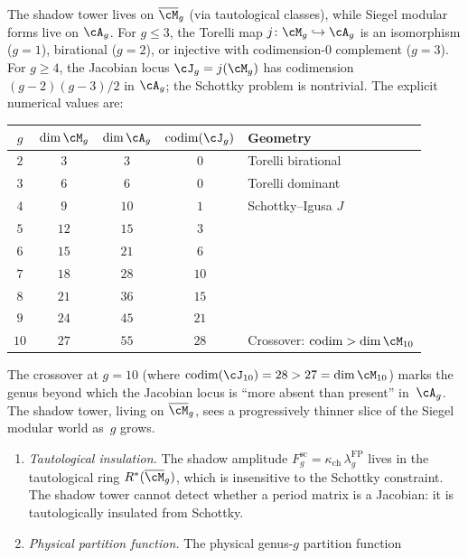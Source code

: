 \begin{openproblem}
\label{op:programme-d-schottky}
The shadow tower lives on $\overline{\cM}_g$
(via tautological classes), while Siegel modular forms
live on $\cA_g$. For $g \leq 3$, the Torelli map
$j \colon \cM_g \hookrightarrow \cA_g$ is an
isomorphism ($g = 1$), birational ($g = 2$), or
injective with codimension-$0$ complement ($g = 3$).
For $g \geq 4$, the Jacobian locus $\cJ_g = j(\cM_g)$
has codimension $(g-2)(g-3)/2$ in $\cA_g$; the
Schottky problem is nontrivial. The explicit numerical
values are:
\begin{center}
\small
\renewcommand{\arraystretch}{1.2}
\begin{tabular}{ccccl}
$g$ & $\dim \cM_g$ & $\dim \cA_g$
 & $\mathrm{codim}(\cJ_g)$ & Geometry \\
\hline
$2$ & $3$ & $3$ & $0$ & Torelli birational \\
$3$ & $6$ & $6$ & $0$ & Torelli dominant \\
$4$ & $9$ & $10$ & $1$ & Schottky--Igusa $J$ \\
$5$ & $12$ & $15$ & $3$ & \\
$6$ & $15$ & $21$ & $6$ & \\
$7$ & $18$ & $28$ & $10$ & \\
$8$ & $21$ & $36$ & $15$ & \\
$9$ & $24$ & $45$ & $21$ & \\
$10$ & $27$ & $55$ & $28$ & Crossover: $\mathrm{codim} > \dim \cM_{10}$
\end{tabular}
\end{center}
The crossover at $g = 10$ (where
$\mathrm{codim}(\cJ_{10}) = 28 > 27 = \dim \cM_{10}$) marks
the genus beyond which the Jacobian locus is ``more absent
than present'' in~$\cA_g$. The shadow tower, living on
$\overline{\cM}_g$, sees a progressively thinner slice of
the Siegel modular world as~$g$ grows.
\begin{enumerate}[label=\textup{(\roman*)}]
\item \emph{Tautological insulation.} The shadow amplitude
 $F_g^{\mathrm{sc}} = \kappa_{\mathrm{ch}}\,\lambda_g^{\mathrm{FP}}$
 lives in the
 tautological ring $R^*(\overline{\cM}_g)$, which is
 insensitive to the Schottky constraint. The shadow
 tower cannot detect whether a period matrix is a
 Jacobian: it is tautologically insulated from Schottky.
\item \emph{Physical partition function.}
 The physical genus-$g$ partition function

\end{enumerate}
\end{openproblem}
